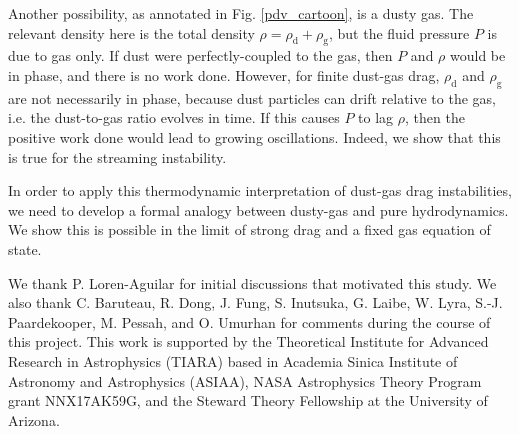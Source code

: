 \documentclass[iop, numberedappendix]{emulateapj}
\newcommand{\rhod}{\rho_\mathrm{d}}
\newcommand{\rhog}{\rho_\mathrm{g}}
\begin{document}

Another possibility, as annotated in Fig. \ref{pdv_cartoon}, is a dusty gas. The
relevant density here is the total density $\rho = \rhod + \rhog$, 
but the fluid pressure $P$ is due to gas only. If dust were 
perfectly-coupled to the gas, then $P$ and $\rho$ would be in phase, 
and there is no work done. However, for finite dust-gas drag, $\rhod$ and
$\rhog$ are not necessarily in phase, because dust particles can
drift relative to the gas{, i.e. the dust-to-gas ratio evolves in time}. 
If this causes $P$ to lag 
$\rho$, then the positive work done would lead to growing
oscillations. Indeed, we show that this is true for the streaming
instability. 

In order to apply this thermodynamic interpretation of dust-gas drag
instabilities, we need to develop a formal analogy between dusty-gas
and pure hydrodynamics. We show this is possible in the limit of
strong drag and a fixed gas equation of state. 





\acknowledgements
We thank P. Loren-Aguilar for initial discussions that motivated this study. We also thank 
C. Baruteau, R. Dong, J. Fung, S. Inutsuka, G. Laibe, W. Lyra, S.-J. Paardekooper, 
M. Pessah, and O. Umurhan for comments during the course of this project. 
This work is supported by the Theoretical Institute for Advanced Research in Astrophysics   
(TIARA) based in Academia Sinica Institute of Astronomy and
Astrophysics (ASIAA), NASA Astrophysics Theory Program grant
NNX17AK59G, and  
the Steward Theory Fellowship at the University of Arizona.   



\appendix




\end{document}
